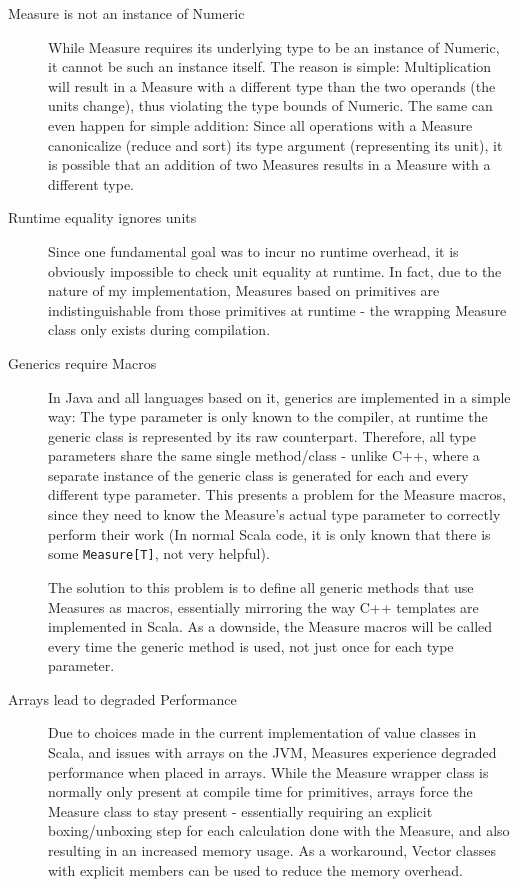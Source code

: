 \documentclass[12pt,oneside,a4paper]{scrbook}
\theoremstyle{definition}
\begin{document}
\begin{description}
  \item[Measure is not an instance of Numeric] While Measure requires its underlying type to be an instance of Numeric, it cannot be such an instance itself. The reason is simple: Multiplication will result in a Measure with a different type than the two operands (the units change), thus violating the type bounds of Numeric. The same can even happen for simple addition: Since all operations with a Measure canonicalize (reduce and sort) its type argument (representing its unit), it is possible that an addition of two Measures results in a Measure with a different type.

  \item[Runtime equality ignores units] Since one fundamental goal was to incur no runtime overhead, it is obviously impossible to check unit equality at runtime. In fact, due to the nature of my implementation, Measures based on primitives are indistinguishable from those primitives at runtime - the wrapping Measure class only exists during compilation.

  \item[Generics require Macros] In Java and all languages based on it, generics are implemented in a simple way: The type parameter is only known to the compiler, at runtime the generic class is represented by its raw counterpart. Therefore, all type parameters share the same single method/class - unlike C++, where a separate instance of the generic class is generated for each and every different type parameter. This presents a problem for the Measure macros, since they need to know the Measure's actual type parameter to correctly perform their work (In normal Scala code, it is only known that there is some \verb|Measure[T]|, not very helpful).

  The solution to this problem is to define all generic methods that use Measures as macros, essentially mirroring the way C++ templates are implemented in Scala. As a downside, the Measure macros will be called every time the generic method is used, not just once for each type parameter.

  \item[Arrays lead to degraded Performance] Due to choices made in the current implementation of value classes in Scala, and issues with arrays on the JVM, Measures experience degraded performance when placed in arrays. While the Measure wrapper class is normally only present at compile time for primitives, arrays force the Measure class to stay present - essentially requiring an explicit boxing/unboxing step for each calculation done with the Measure, and also resulting in an increased memory usage. As a workaround, Vector classes with explicit members can be used to reduce the memory overhead.


\end{description}
\end{document}
